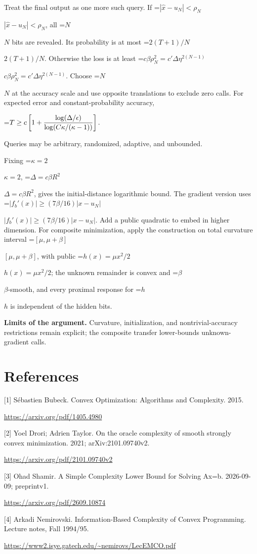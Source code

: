 \documentclass[10pt,a4paper]{article}
\newcommand{\AtlasMath}[1]{\par\begingroup\centering\setbox0=\hbox{$\displaystyle #1$}\ifdim\wd0>1.4\linewidth\typeout{ATLAS WIDE FORMULA: \the\wd0}\fi\ifdim\wd0>\linewidth\resizebox{\linewidth}{!}{\box0}\else\box0\fi\par\endgroup}
\newcommand{\AtlasInlineMath}[1]{\begingroup\setbox0=\hbox{$#1$}\ifdim\wd0>.4\linewidth\endgroup\AtlasMath{#1}\else\endgroup$#1$\fi}
\begin{document}
Treat the final output as one more such query. If \AtlasInlineMath{|\widehat x-u_N|<\rho_N}, all \AtlasInlineMath{N} bits are revealed. Its probability is at most \AtlasInlineMath{2(T+1)/N}. Otherwise the loss is at least
\AtlasInlineMath{c\beta\rho_N^2=c'\Delta\eta^{2(N-1)}}.
Choose \AtlasInlineMath{N} at the accuracy scale and use opposite translations to exclude zero calls. For expected error and constant-probability accuracy,

\AtlasMath{T\ge c\left[1+{\log(\Delta/\epsilon)\over
\log(C\kappa/(\kappa-1))}\right].}

Queries may be arbitrary, randomized, adaptive, and unbounded.

Fixing \AtlasInlineMath{\kappa=2}, \AtlasInlineMath{\Delta=c\beta R^2}, gives the initial-distance logarithmic bound. The gradient version uses
\AtlasInlineMath{|f_b'(x)|\ge(7\beta/16)|x-u_N|}.
Add a public quadratic to embed in higher dimension. For composite minimization, apply the construction on total curvature interval \AtlasInlineMath{[\mu,\mu+\beta]}, with public \AtlasInlineMath{h(x)=\mu x^2/2}; the unknown remainder is convex and \AtlasInlineMath{\beta}-smooth, and every proximal response for \AtlasInlineMath{h} is independent of the hidden bits.

\textbf{Limits of the argument.} Curvature, initialization, and nontrivial-accuracy restrictions remain explicit; the composite transfer lower-bounds unknown-gradient calls.

\section{References}
[1] Sébastien Bubeck. Convex Optimization: Algorithms and Complexity. 2015.

\url{https://arxiv.org/pdf/1405.4980}

[2] Yoel Drori; Adrien Taylor. On the oracle complexity of smooth strongly convex minimization. 2021; arXiv:2101.09740v2.

\url{https://arxiv.org/pdf/2101.09740v2}

[3] Ohad Shamir. A Simple Complexity Lower Bound for Solving Ax=b. 2026-09-09; preprintv1.

\url{https://arxiv.org/pdf/2609.10874}

[4] Arkadi Nemirovski. Information-Based Complexity of Convex Programming. Lecture notes, Fall 1994/95.

\url{https://www2.isye.gatech.edu/~nemirovs/LecEMCO.pdf}
\end{document}
